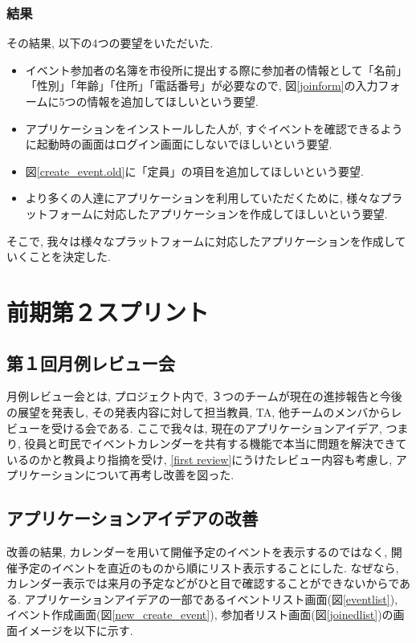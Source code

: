 \subsubsection{結果}
その結果, 以下の4つの要望をいただいた.
\begin{itemize}
    \item イベント参加者の名簿を市役所に提出する際に参加者の情報として「名前」「性別」「年齢」「住所」「電話番号」が必要なので, 図\ref{joinform}の入力フォームに5つの情報を追加してほしいという要望.
    \item アプリケーションをインストールした人が, すぐイベントを確認できるように起動時の画面はログイン画面にしないでほしいという要望.
    \item 図\ref{create_event.old}に「定員」の項目を追加してほしいという要望.
    \item より多くの人達にアプリケーションを利用していただくために, 様々なプラットフォームに対応したアプリケーションを作成してほしいという要望.
\end{itemize}
そこで, 我々は様々なプラットフォームに対応したアプリケーションを作成していくことを決定した.

\section{前期第２スプリント}

\subsection{第１回月例レビュー会}
月例レビュー会とは, プロジェクト内で, ３つのチームが現在の進捗報告と今後の展望を発表し, その発表内容に対して担当教員, TA, 他チームのメンバからレビューを受ける会である.
ここで我々は, 現在のアプリケーションアイデア, つまり, 役員と町民でイベントカレンダーを共有する機能で本当に問題を解決できているのかと教員より指摘を受け,
\ref{first review}にうけたレビュー内容も考慮し, アプリケーションについて再考し改善を図った.


\subsection{アプリケーションアイデアの改善}
改善の結果, カレンダーを用いて開催予定のイベントを表示するのではなく,
開催予定のイベントを直近のものから順にリスト表示することにした.
なぜなら, カレンダー表示では来月の予定などがひと目で確認することができないからである.
アプリケーションアイデアの一部であるイベントリスト画面(図\ref{eventlist}),
イベント作成画面(図\ref{new_create_event}), 参加者リスト画面(図\ref{joinedlist})の画面イメージを以下に示す.

